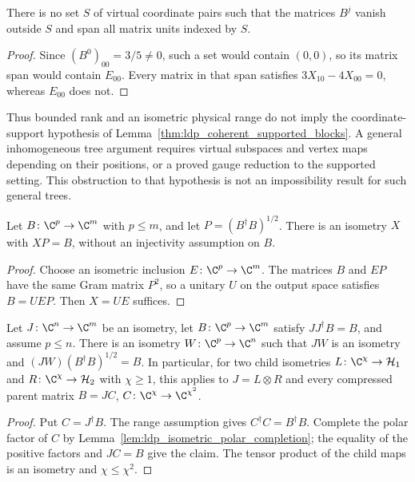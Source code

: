 \begin{lemma}
    \label{lem:ldp_rotated_ghz_no_coordinate_support}
    \leanok
    There is no set $S$ of virtual coordinate pairs such that the matrices
    $B^j$ vanish outside $S$ and span all matrix units indexed by $S$.
\end{lemma}
\begin{proof}\leanok
    Since $(B^0)_{00}=3/5\ne0$, such a set would contain $(0,0)$, so its
    matrix span would contain $E_{00}$. Every matrix in that span satisfies
    $3X_{10}-4X_{00}=0$, whereas $E_{00}$ does not.
\end{proof}

Thus bounded rank and an isometric physical range do not imply the
coordinate-support hypothesis of
Lemma~\ref{thm:ldp_coherent_supported_blocks}. A general inhomogeneous
tree argument requires virtual subspaces and vertex maps depending on their
positions, or a proved gauge reduction to the supported setting. This
obstruction to that hypothesis is not an impossibility result for such
general trees.

\begin{lemma}
    \label{lem:ldp_isometric_polar_completion}
    \leanok
    Let $B\colon\C^p\to\C^m$ with $p\le m$, and let
    $P=(B^\dagger B)^{1/2}$. There is an isometry $X$ with $XP=B$,
    without an injectivity assumption on $B$.
\end{lemma}
\begin{proof}\leanok
    Choose an isometric inclusion $E\colon\C^p\to\C^m$.
    The matrices $B$ and $EP$ have the same Gram matrix $P^2$, so a unitary
    $U$ on the output space satisfies $B=UEP$. Then $X=UE$ suffices.
\end{proof}

\begin{lemma}
    \label{lem:ldp_isometric_polar_merge}
    \leanok
    Let $J\colon\C^n\to\C^m$ be an isometry, let
    $B\colon\C^p\to\C^m$ satisfy $JJ^\dagger B=B$, and assume $p\le n$.
    There is an isometry $W\colon\C^p\to\C^n$ such that $JW$ is an
    isometry and $(JW)(B^\dagger B)^{1/2}=B$.
    In particular, for two child isometries
    $L\colon\C^\chi\to\mathcal H_1$ and
    $R\colon\C^\chi\to\mathcal H_2$ with $\chi\ge1$, this applies to
    $J=L\otimes R$ and every compressed parent matrix
    $B=JC$, $C\colon\C^\chi\to\C^{\chi^2}$.
\end{lemma}
\begin{proof}\leanok
    Put $C=J^\dagger B$. The range assumption gives
    $C^\dagger C=B^\dagger B$. Complete the polar factor of $C$ by
    Lemma~\ref{lem:ldp_isometric_polar_completion}; the equality of the
    positive factors and $JC=B$ give the claim. The tensor product of the
    child maps is an isometry and $\chi\le\chi^2$.
\end{proof}

